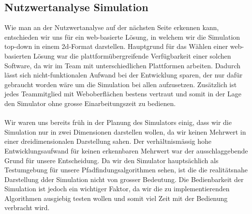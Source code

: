 \documentclass[main.tex]{subfiles} %
\begin{document}

\subsection{Nutzwertanalyse Simulation}

Wie man an der Nutzwertanalyse auf der nächsten Seite erkennen kann, entschieden wir
uns für ein web-basierte Lösung, in welchem wir die Simulation top-down in einem 2d-Format darstellen.
Hauptgrund für das Wählen einer web-basierten Lösung war die plattformübergreifende Verfügbarkeit einer
solchen Software, da wir im Team mit unterschiedlichen Plattformen arbeiten. Dadurch lässt sich
nicht-funktionalen Aufwand bei der Entwicklung sparen, der nur dafür gebraucht worden wäre um die Simulation
bei allen aufzusetzen. Zusätzlich ist jedes Teammitglied mit Weboberflächen bestens vertraut und somit in
der Lage den Simulator ohne grosse Einarbeitungszeit zu bedienen.
\\\\
Wir waren uns bereits früh in der Planung des Simulators einig, dass wir
die Simulation nur in zwei Dimensionen darstellen wollen, da wir keinen Mehrwert in einer
dreidimensionalen Darstellung sahen. Der verhältnismässig hohe Entwicklungsaufwand für keinen erkennbaren
Mehrwert war der ausschlaggebende Grund für unsere Entscheidung. Da wir den Simulator hauptsächlich als
Testumgebung für unsere Pfadfindungsalgorithmen sehen, ist die die realitätsnahe Darstellung dder Simulation
nicht von grosser Bedeutung. Die Bedienbarkeit der Simulation ist jedoch ein wichtiger Faktor, da wir
die zu implementierenden Algorithmen ausgiebig testen wollen und somit viel Zeit mit der Bedienung verbracht wird.
\end{document}
